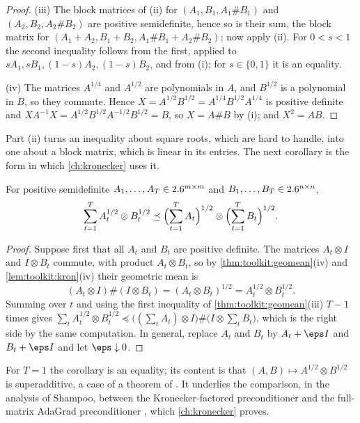\begin{refsection}
\begin{proof}
(iii) The block matrices of (ii) for $(A_1,B_1,A_1\#B_1)$ and $(A_2,B_2,A_2\#B_2)$ are positive semidefinite, hence so is their sum, the block matrix for $(A_1+A_2,B_1+B_2,A_1\#B_1+A_2\#B_2)$; now apply (ii). For $0<s<1$ the second inequality follows from the first, applied to $sA_1,sB_1,(1-s)A_2,(1-s)B_2$, and from (i); for $s\in\{0,1\}$ it is an equality.

(iv) The matrices $A^{1/4}$ and $A^{1/2}$ are polynomials in $A$, and $B^{1/2}$ is a polynomial in $B$, so they commute. Hence $X=A^{1/2}B^{1/2}=A^{1/4}B^{1/2}A^{1/4}$ is positive definite and $XA^{-1}X=A^{1/2}B^{1/2}A^{-1/2}B^{1/2}=B$, so $X=A\#B$ by (i); and $X^2=AB$.
\end{proof}

Part (ii) turns an inequality about square roots, which are hard to handle, into one about a block matrix, which is linear in its entries. The next corollary is the form in which \cref{ch:kronecker} uses it.

\begin{corollary}\label{cor:toolkit:kronmean}
For positive semidefinite $A_1,\dots,A_T\in2.6^{m\times m}$ and $B_1,\dots,B_T\in2.6^{n\times n}$,
\[
  \sum_{t=1}^TA_t^{1/2}\otimes B_t^{1/2}\preceq\Bigl(\sum_{t=1}^TA_t\Bigr)^{1/2}\otimes\Bigl(\sum_{t=1}^TB_t\Bigr)^{1/2}.
\]
\end{corollary}

\begin{proof}
Suppose first that all $A_t$ and $B_t$ are positive definite. The matrices $A_t\otimes I$ and $I\otimes B_t$ commute, with product $A_t\otimes B_t$, so by \cref{thm:toolkit:geomean}(iv) and \cref{lem:toolkit:kron}(iv) their geometric mean is
\[
  (A_t\otimes I)\#(I\otimes B_t)=(A_t\otimes B_t)^{1/2}=A_t^{1/2}\otimes B_t^{1/2}.
\]
Summing over $t$ and using the first inequality of \cref{thm:toolkit:geomean}(iii) $T-1$ times gives $\sum_tA_t^{1/2}\otimes B_t^{1/2}\preceq\bigl((\sum_tA_t)\otimes I\bigr)\#\bigl(I\otimes\sum_tB_t\bigr)$, which is the right side by the same computation. In general, replace $A_t$ and $B_t$ by $A_t+\eps I$ and $B_t+\eps I$ and let $\eps\downarrow0$.
\end{proof}

For $T=1$ the corollary is an equality; its content is that $(A,B)\mapsto A^{1/2}\otimes B^{1/2}$ is superadditive, a case of a theorem of \textcite{Ando1979}. It underlies the comparison, in the analysis of Shampoo, between the Kronecker-factored preconditioner and the full-matrix AdaGrad preconditioner \parencite{GuptaKorenSinger2018}, which \cref{ch:kronecker} proves.


\end{refsection}
